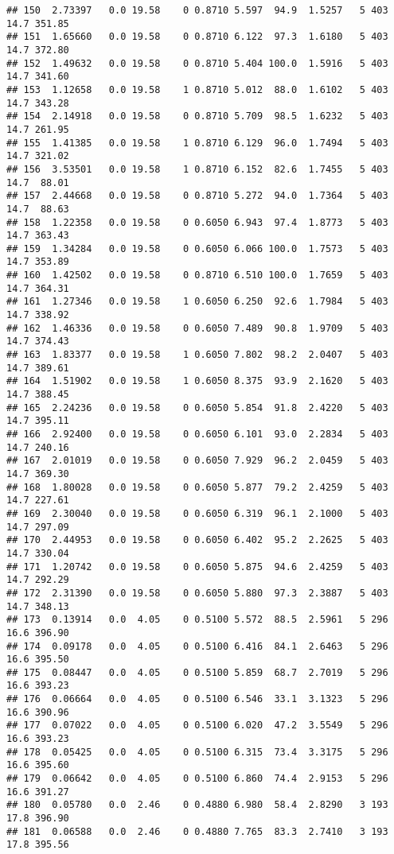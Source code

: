 \documentclass[
]{article}
\begin{document}
\begin{verbatim}
## 150  2.73397   0.0 19.58    0 0.8710 5.597  94.9  1.5257   5 403    14.7 351.85
## 151  1.65660   0.0 19.58    0 0.8710 6.122  97.3  1.6180   5 403    14.7 372.80
## 152  1.49632   0.0 19.58    0 0.8710 5.404 100.0  1.5916   5 403    14.7 341.60
## 153  1.12658   0.0 19.58    1 0.8710 5.012  88.0  1.6102   5 403    14.7 343.28
## 154  2.14918   0.0 19.58    0 0.8710 5.709  98.5  1.6232   5 403    14.7 261.95
## 155  1.41385   0.0 19.58    1 0.8710 6.129  96.0  1.7494   5 403    14.7 321.02
## 156  3.53501   0.0 19.58    1 0.8710 6.152  82.6  1.7455   5 403    14.7  88.01
## 157  2.44668   0.0 19.58    0 0.8710 5.272  94.0  1.7364   5 403    14.7  88.63
## 158  1.22358   0.0 19.58    0 0.6050 6.943  97.4  1.8773   5 403    14.7 363.43
## 159  1.34284   0.0 19.58    0 0.6050 6.066 100.0  1.7573   5 403    14.7 353.89
## 160  1.42502   0.0 19.58    0 0.8710 6.510 100.0  1.7659   5 403    14.7 364.31
## 161  1.27346   0.0 19.58    1 0.6050 6.250  92.6  1.7984   5 403    14.7 338.92
## 162  1.46336   0.0 19.58    0 0.6050 7.489  90.8  1.9709   5 403    14.7 374.43
## 163  1.83377   0.0 19.58    1 0.6050 7.802  98.2  2.0407   5 403    14.7 389.61
## 164  1.51902   0.0 19.58    1 0.6050 8.375  93.9  2.1620   5 403    14.7 388.45
## 165  2.24236   0.0 19.58    0 0.6050 5.854  91.8  2.4220   5 403    14.7 395.11
## 166  2.92400   0.0 19.58    0 0.6050 6.101  93.0  2.2834   5 403    14.7 240.16
## 167  2.01019   0.0 19.58    0 0.6050 7.929  96.2  2.0459   5 403    14.7 369.30
## 168  1.80028   0.0 19.58    0 0.6050 5.877  79.2  2.4259   5 403    14.7 227.61
## 169  2.30040   0.0 19.58    0 0.6050 6.319  96.1  2.1000   5 403    14.7 297.09
## 170  2.44953   0.0 19.58    0 0.6050 6.402  95.2  2.2625   5 403    14.7 330.04
## 171  1.20742   0.0 19.58    0 0.6050 5.875  94.6  2.4259   5 403    14.7 292.29
## 172  2.31390   0.0 19.58    0 0.6050 5.880  97.3  2.3887   5 403    14.7 348.13
## 173  0.13914   0.0  4.05    0 0.5100 5.572  88.5  2.5961   5 296    16.6 396.90
## 174  0.09178   0.0  4.05    0 0.5100 6.416  84.1  2.6463   5 296    16.6 395.50
## 175  0.08447   0.0  4.05    0 0.5100 5.859  68.7  2.7019   5 296    16.6 393.23
## 176  0.06664   0.0  4.05    0 0.5100 6.546  33.1  3.1323   5 296    16.6 390.96
## 177  0.07022   0.0  4.05    0 0.5100 6.020  47.2  3.5549   5 296    16.6 393.23
## 178  0.05425   0.0  4.05    0 0.5100 6.315  73.4  3.3175   5 296    16.6 395.60
## 179  0.06642   0.0  4.05    0 0.5100 6.860  74.4  2.9153   5 296    16.6 391.27
## 180  0.05780   0.0  2.46    0 0.4880 6.980  58.4  2.8290   3 193    17.8 396.90
## 181  0.06588   0.0  2.46    0 0.4880 7.765  83.3  2.7410   3 193    17.8 395.56

\end{verbatim}
\end{document}
